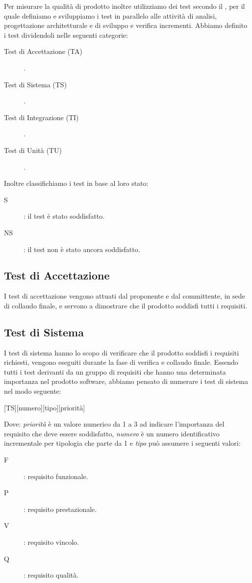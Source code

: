 \documentclass[../piano-di-qualifica.tex]{subfiles}
\begin{document}
Per misurare la qualità di prodotto inoltre utilizziamo dei test secondo il , per il quale definiamo e sviluppiamo i test in parallelo alle attività di analisi, progettazione architetturale e di sviluppo e verifica incrementi.
Abbiamo definito i test dividendoli nelle seguenti categorie:
\begin{description}
  \item [Test di Accettazione (TA)].
  \item [Test di Sistema (TS)].
  \item [Test di Integrazione (TI)].
  \item [Test di Unità (TU)].
\end{description}

Inoltre classifichiamo i test in base al loro stato:
\begin{description}
  \item [S]: il test è stato soddisfatto.
  \item [NS]: il test non è stato ancora soddisfatto.
\end{description}

\subsection{Test di Accettazione}%
\label{sub:test_di_accettazione}

I test di accettazione vengono attuati dal proponente e dal committente, in sede di collaudo finale, e servono a dimostrare che il prodotto soddisfi tutti i requisiti.

\subsection{Test di Sistema}%
\label{sub:test_di_sistema}

I test di sistema hanno lo scopo di verificare che il prodotto soddisfi i requisiti richiesti, vengono eseguiti durante la fase di verifica e collaudo finale.
Essendo tutti i test derivanti da un gruppo di requisiti che hanno una determinata importanza nel prodotto software, abbiamo pensato di numerare i test di sistema nel modo seguente:
\begin{center}
  [TS][numero][tipo][priorità]
\end{center}

Dove: \textit{priorità} è un valore numerico da 1 a 3 ad indicare l'importanza del requisito che deve essere soddisfatto, \textit{numero} è un numero identificativo incrementale per tipologia che parte da 1 e \textit{tipo} può assumere i seguenti valori:
\begin{description}
  \item [F]: requisito funzionale.
  \item [P]: requisito prestazionale.
  \item [V]: requisito vincolo.
  \item [Q]: requisito qualità.
\end{description}
\end{document}
